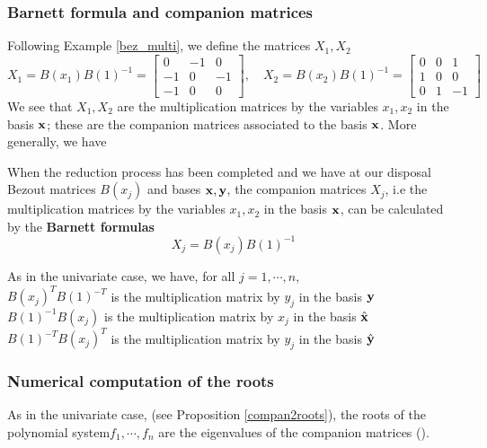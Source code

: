 \documentclass{standalone}
\begin{document}
\subsubsection{Barnett formula and companion matrices}
Following Example \ref{bez_multi}, we define the matrices $X_1, X_2$
\begin{equation}
	X_1 = B(x_1)B(1)^{-1} =
	\begin{bmatrix}
		0 & -1 & 0\\
		-1 & 0 & -1\\
		-1 & 0 & 0
	\end{bmatrix},\quad
	X_2 = B(x_2)B(1)^{-1} =
	\begin{bmatrix}
		0 & 0 & 1\\
		1 & 0 & 0\\
		0 & 1 & -1
	\end{bmatrix}
\end{equation}
We see that $X_1, X_2$ are the multiplication matrices by the variables $x_1, x_2$ in the basis $\bold{x}$; these are the companion matrices associated to the basis $\bold{x}$. More generally, we have
\begin{prop}
\label{Barnett_multi}
When the reduction process has been completed and we have at our disposal Bezout matrices $B(x_j)$ and bases $\bold{x, y}$, the companion matrices $X_j$, i.e the multiplication matrices by the variables $x_1, x_2$ in the basis $\bold{x}$, can be calculated by the {\bf Barnett formulas}
\begin{equation}
	X_j = B(x_j)B(1)^{-1}
\end{equation}
\end{prop}

\begin{rem}
As in the univariate case, we have, for all $j=1,\cdots,n$,\\
$B(x_j)^{T}B(1)^{-T}$ is the multiplication matrix by $y_j$ in the basis $\bold{y}$ \\
$B(1)^{-1}B(x_j)$  is the multiplication matrix by $x_j$ in the basis $\hat{\bold{x}}$ \\
$B(1)^{-T}B(x_j)^{T}$  is the multiplication matrix by $y_j$ in the basis $\hat{\bold{y}}$
\end{rem}

\subsubsection{Numerical computation of the roots}
As in the univariate case, (see Proposition \ref{compan2roots}), the roots of the polynomial system$f_1, \cdots, f_n$ are the eigenvalues of the companion matrices (\cite{AS}).
\end{document}
